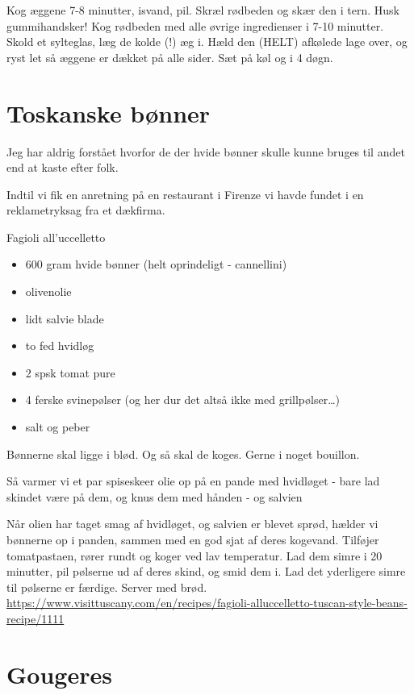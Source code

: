 \documentclass[
]{book}
\providecommand{\tightlist}{%
  \setlength{\itemsep}{0pt}\setlength{\parskip}{0pt}}
\begin{document}
Kog æggene 7-8 minutter, isvand, pil.
Skræl rødbeden og skær den i tern. Husk gummihandsker!
Kog rødbeden med alle øvrige ingredienser i 7-10 minutter.
Skold et sylteglas, læg de kolde (!) æg i. Hæld den (HELT)
afkølede lage over, og ryst let så æggene er dækket på alle sider.
Sæt på køl og i 4 døgn.

\hypertarget{toskanske-buxf8nner}{%
\section{Toskanske bønner}\label{toskanske-buxf8nner}}

Jeg har aldrig forstået hvorfor de der hvide bønner skulle kunne bruges til
andet end at kaste efter folk.

Indtil vi fik en anretning på en restaurant i Firenze vi havde fundet i en
reklametryksag fra et dækfirma.

Fagioli all'uccelletto

\begin{itemize}
\tightlist
\item
  600 gram hvide bønner (helt oprindeligt - cannellini)
\item
  olivenolie
\item
  lidt salvie blade
\item
  to fed hvidløg
\item
  2 spsk tomat pure
\item
  4 ferske svinepølser (og her dur det altså ikke med grillpølser\ldots)
\item
  salt og peber
\end{itemize}

Bønnerne skal ligge i blød. Og så skal de koges. Gerne i noget bouillon.

Så varmer vi et par spiseskeer olie op på en pande med hvidløget -
bare lad skindet være på dem, og knus dem med hånden - og salvien

Når olien har taget smag af hvidløget, og salvien er blevet sprød,
hælder vi bønnerne op i panden, sammen med en god sjat af deres kogevand.
Tilføjer tomatpastaen, rører rundt og koger ved lav temperatur. Lad dem
simre i 20 minutter, pil pølserne ud af deres skind, og smid dem i. Lad det yderligere
simre til pølserne er færdige. Server med brød.
\url{https://www.visittuscany.com/en/recipes/fagioli-alluccelletto-tuscan-style-beans-recipe/1111}

\hypertarget{gougeres}{%
\section{Gougeres}\label{gougeres}}
\end{document}

